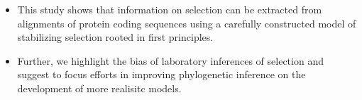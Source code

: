 \documentclass[12pt]{article}
\begin{document}
\begin{itemize}
	\begin{itemize}
		\item This study shows that information on selection can be extracted from alignments of protein coding sequences using a carefully constructed model of stabilizing selection rooted in first principles.
		\item Further, we highlight the bias of laboratory inferences of selection and suggest to focus efforts in improving phylogenetic inference on the development of more realisitc models.
	\end{itemize}
\end{itemize}



\end{document}

